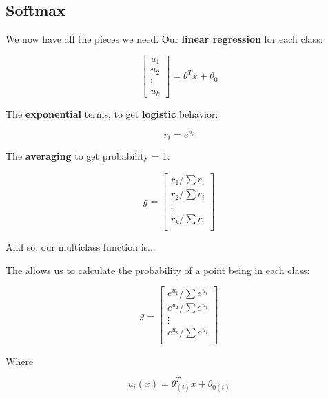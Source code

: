     \subsection{Softmax}
        
        We now have all the pieces we need. Our \textbf{linear regression} for each class:
        
        \begin{equation}
            \begin{bmatrix}
                u_1 \\ u_2 \\ \vdots \\ u_k
            \end{bmatrix}
            = 
            \theta^T x + \theta_0
        \end{equation}
        
        The \textbf{exponential} terms, to get \textbf{logistic} behavior:
        
        \begin{equation}
            r_i = e^{u_i}
        \end{equation}
        
        The \textbf{averaging} to get probability = 1:
        
        \begin{equation}
            g = 
            \begin{bmatrix}
                r_1/\sum r_i  \\
                r_2/\sum r_i  \\
                \vdots  \\
                r_k/\sum r_i  \\
            \end{bmatrix}
        \end{equation}
        
        And so, our multiclass function is...\\
        
        \begin{definition}
            The  allows us to calculate the probability of a point being in each class:
            
            \begin{equation*}
                g = 
                \begin{bmatrix}
                    e^{u_1}/\sum e^{u_i}  \\
                    e^{u_2}/\sum e^{u_i}  \\
                    \vdots  \\
                    e^{u_k}/\sum e^{u_i}  \\
                \end{bmatrix}
            \end{equation*}
            
            Where
            
            \begin{equation}
                u_i(x) = \theta_{(i)}^T x + \theta_{0(i)}
            \end{equation}
        \end{definition}
        
